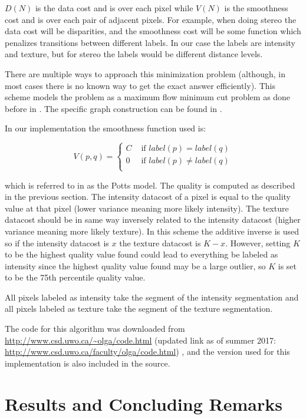\documentclass[twocolumn]{article}
\begin{document}
$D(N)$ is the data cost and is over each pixel while $V(N)$ is the
smoothness cost and is over each pair of adjacent pixels. For example,
when doing stereo the data cost will be disparities, and the
smoothness cost will be some function which penalizes transitions
between different labels. In our case the labels are intensity and
texture, but for stereo the labels would be different distance
levels. 

There are multiple ways to approach this minimization problem
(although, in most cases there is no known way to get the
exact answer efficiently). This scheme models the problem as a
maximum flow minimum cut problem as done before in \cite{prev}. The
specific graph construction can be found in \cite{fusion1}. 

In our implementation the smoothness function used is: 

\begin{equation*}
V(p,q) = \begin{cases}
C&\text{ if $label(p)=label(q)$}\\
0&\text{ if $label(p) \neq label(q)$}\\
\end{cases}
\end{equation*}


which is referred to in \cite{fusion1} as the Potts model. The quality is
computed as described in the previous section. The intensity datacost
of a pixel is equal to the quality value at that pixel (lower variance
meaning more likely intensity). The texture datacost should be in same
way inversely related to the intensity datacost (higher variance
meaning more likely texture). In this scheme the additive inverse is
used so if the intensity datacost is $x$ the texture datacost is
$K-x$. However, setting $K$ to be the highest quality value found could lead
to everything be labeled as intensity since the highest quality value
found may be a large outlier, so $K$ is set to be the 75th percentile
quality value.    

All pixels labeled as intensity take the segment of the 
intensity segmentation and all pixels labeled as texture take the
segment of the texture segmentation. 

The code for this algorithm was downloaded from 
\url{http://www.csd.uwo.ca/~olga/code.html} (updated 
link as of summer 2017: \url{http://www.csd.uwo.ca/faculty/olga/code.html})
, and the version used for this implementation is also 
included in the source.   

\section{Results and Concluding Remarks}
\end{document}
